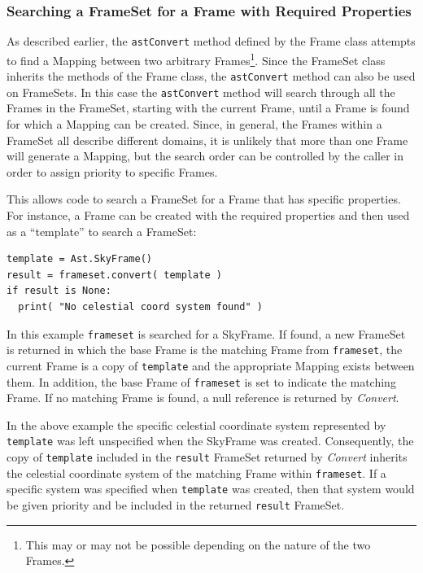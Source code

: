 \documentclass[final,authoryear,5p,times,twocolumn]{elsarticle}
\begin{document}
\subsubsection{Searching a FrameSet for a Frame with Required Properties}
As described earlier, the \texttt{astConvert} method defined by the Frame
class attempts to find a Mapping between two arbitrary
Frames\footnote{This may or may not be possible depending on the nature
of the two Frames.}. Since the FrameSet class inherits the methods of the
Frame class, the \texttt{astConvert} method can also be used on FrameSets. In
this case the \texttt{astConvert} method will search through all the Frames
in the FrameSet, starting with the current Frame, until a Frame is found
for which a Mapping can be created. Since, in general, the Frames within a
FrameSet all describe different domains, it is unlikely that more than one
Frame will generate a Mapping, but the search order can be controlled by
the caller in order to assign priority to specific Frames.

This allows code to search a FrameSet for a Frame that has specific
properties. For instance, a Frame can be created with the required
properties and then used as a ``template'' to search a FrameSet:

\begin{lstlisting}
template = Ast.SkyFrame()
result = frameset.convert( template )
if result is None:
  print( "No celestial coord system found" )
\end{lstlisting}

In this example \texttt{frameset} is searched for a SkyFrame. If found, a
new FrameSet is returned in which the base Frame is the matching Frame
from \texttt{frameset}, the current Frame is a copy of \texttt{template} and
the appropriate Mapping exists between them. In addition, the base Frame
of \texttt{frameset} is set to indicate the matching Frame. If no matching
Frame is found, a null reference is returned by \emph{Convert}.

In the above example the specific celestial coordinate system represented
by \texttt{template} was left unspecified when the SkyFrame was created.
Consequently, the copy of \texttt{template} included in the
\texttt{result} FrameSet returned by \emph{Convert} inherits the
celestial coordinate system of the matching Frame within
\texttt{frameset}. If a specific system was specified when \texttt{template}
was created, then that system would be given priority and be included in
the returned \texttt{result} FrameSet.
\end{document}
